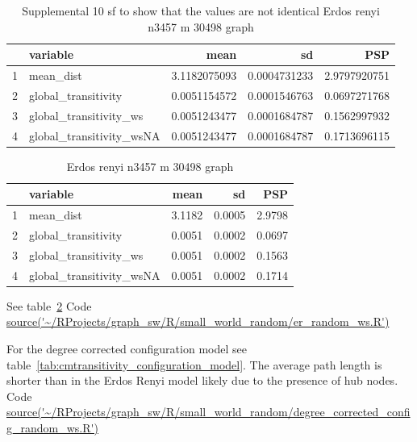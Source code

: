 \begin{table}[ht]
\centering
\begin{tabular}{rlrrr}
  \hline
 & variable & mean & sd & PSP \\ 
  \hline
1 & mean\_dist & 3.1182075093 & 0.0004731233 & 2.9797920751 \\ 
  2 & global\_transitivity & 0.0051154572 & 0.0001546763 & 0.0697271768 \\ 
  3 & global\_transitivity\_ws & 0.0051243477 & 0.0001684787 & 0.1562997932 \\ 
  4 & global\_transitivity\_wsNA & 0.0051243477 & 0.0001684787 & 0.1713696115 \\ 
   \hline
\end{tabular}
\caption{Supplemental 10 sf to show that the values are not identical Erdos renyi n3457 m 30498 graph}
\label{tab:transitivity_erdos_renyi 10sf}
\end{table}

\begin{table}[ht]
\centering
\begin{tabular}{rlrrr}
  \hline
 & variable & mean & sd & PSP \\ 
  \hline
1 & mean\_dist & 3.1182 & 0.0005 & 2.9798 \\ 
  2 & global\_transitivity & 0.0051 & 0.0002 & 0.0697 \\ 
  3 & global\_transitivity\_ws & 0.0051 & 0.0002 & 0.1563 \\ 
  4 & global\_transitivity\_wsNA & 0.0051 & 0.0002 & 0.1714 \\ 
   \hline
\end{tabular}
\caption{Erdos renyi n3457 m 30498 graph}
\label{tab:transitivity_erdos_renyi}
\end{table}

See table~\ref{tab:transitivity_erdos_renyi}
Code \url{source('~/RProjects/graph_sw/R/small_world_random/er_random_ws.R')}

For the degree corrected configuration model see table~\ref{tab:cmtransitivity_configuration_model}. The average path length is shorter than in the Erdos Renyi model likely due to the presence of hub nodes. Code \url{source('~/RProjects/graph_sw/R/small_world_random/degree_corrected_config_random_ws.R')}

